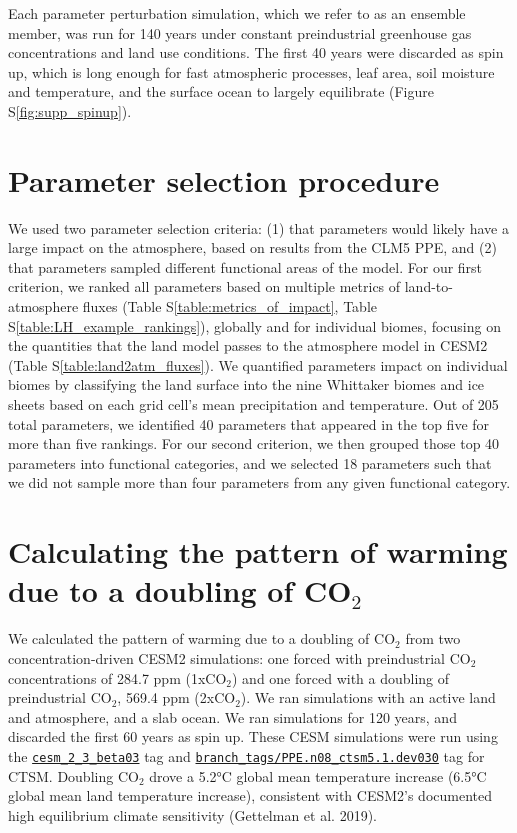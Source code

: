 \documentclass[draft, grl]{agujournal2019}
\begin{document}
Each parameter perturbation simulation, which we refer to as an ensemble member, was run for 140 years under constant preindustrial greenhouse gas concentrations and land use conditions. The first 40 years were discarded as spin up, which is long enough for fast atmospheric processes, leaf area, soil moisture and temperature, and the surface ocean to largely equilibrate (Figure S\ref{fig:supp_spinup}).

\section{Parameter selection procedure}
\label{Text:parameter_selection}
We used two parameter selection criteria: (1) that parameters would likely have a large impact on the atmosphere, based on results from the CLM5 PPE, and (2) that parameters sampled different functional areas of the model. For our first criterion, we ranked all parameters based on multiple metrics of land-to-atmosphere fluxes (Table S\ref{table:metrics_of_impact}, Table S\ref{table:LH_example_rankings}), globally and for individual biomes, focusing on the quantities that the land model passes to the atmosphere model in CESM2 (Table S\ref{table:land2atm_fluxes}). We quantified parameters impact on individual biomes by classifying the land surface into the nine Whittaker biomes \citep{whittaker_communities_1975} and ice sheets based on each grid cell's mean precipitation and temperature. Out of 205 total parameters, we identified 40 parameters that appeared in the top five for more than five rankings. For our second criterion, we then grouped those top 40 parameters into functional categories, and we selected 18 parameters such that we did not sample more than four parameters from any given functional category. 

\section{Calculating the pattern of warming due to a doubling of CO$_2$}
\label{Text:doubling_CO2}
We calculated the pattern of warming due to a doubling of CO$_2$ from  two concentration-driven CESM2 simulations: one forced with preindustrial CO$_2$ concentrations of 284.7 ppm (1xCO$_2$) and one forced with a doubling of preindustrial CO$_2$, 569.4 ppm (2xCO$_2$). We ran simulations with an active land and atmosphere, and a slab ocean. We ran simulations for 120 years, and discarded the first 60 years as spin up. These CESM simulations were run using the \href{https://github.com/ESCOMP/CESM/releases/tag/cesm2_3_beta03}{\texttt{cesm_2_3_beta03}} tag and \href{https://github.com/ESCOMP/CTSM/releases/tag/branch_tags%2FPPE.n08_ctsm5.1.dev030}{\texttt{branch_tags/PPE.n08_ctsm5.1.dev030}} tag for CTSM. Doubling CO$_2$ drove a 5.2°C global mean temperature increase (6.5°C global mean land temperature increase), consistent with CESM2's documented high equilibrium climate sensitivity (Gettelman et al. 2019). 
\\[16pt]
\end{document}
